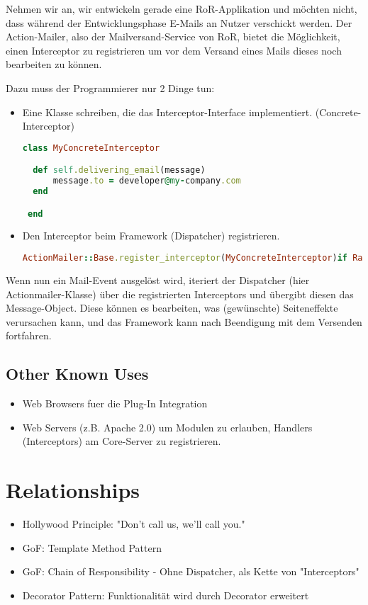 Nehmen wir an, wir entwickeln gerade eine RoR-Applikation und möchten nicht, dass während der Entwicklungsphase E-Mails an Nutzer verschickt werden. Der Action-Mailer, also der Mailversand-Service von RoR, bietet die Möglichkeit, einen Interceptor zu registrieren um vor dem Versand eines Mails dieses noch bearbeiten zu können.

Dazu muss der Programmierer nur 2 Dinge tun:
\begin{itemize}
    \item{Eine Klasse schreiben, die das Interceptor-Interface implementiert. (Concrete-Interceptor)
      \begin{lstlisting}[language=Ruby]
class MyConcreteInterceptor

  def self.delivering_email(message)
      message.to = developer@my-company.com
  end

 end\end{lstlisting}
}
    \item{Den Interceptor beim Framework (Dispatcher) registrieren.
      \begin{lstlisting}[language=Ruby]
ActionMailer::Base.register_interceptor(MyConcreteInterceptor)if Rails.env.development?\end{lstlisting}
}

  \end{itemize}
  Wenn nun ein Mail-Event ausgelöst wird, iteriert der Dispatcher (hier Actionmailer-Klasse) über die registrierten Interceptors und übergibt diesen das Message-Object. Diese können es bearbeiten, was (gewünschte) Seiteneffekte verursachen kann, und das Framework kann nach Beendigung mit dem Versenden fortfahren.

\subsection{Other Known Uses}
\begin{itemize}
  \item Web Browsers fuer die Plug-In Integration
  \item Web Servers (z.B. Apache 2.0) um Modulen zu erlauben, Handlers (Interceptors) am Core-Server zu registrieren.
\end{itemize}


\section{Relationships}
\begin{itemize}
  \item Hollywood Principle: "Don't call us, we'll call you."
  \item GoF: Template Method Pattern
  \item GoF: Chain of Responsibility - Ohne Dispatcher, als Kette von "Interceptors"
  \item Decorator Pattern: Funktionalität wird durch Decorator erweitert
\end{itemize}

